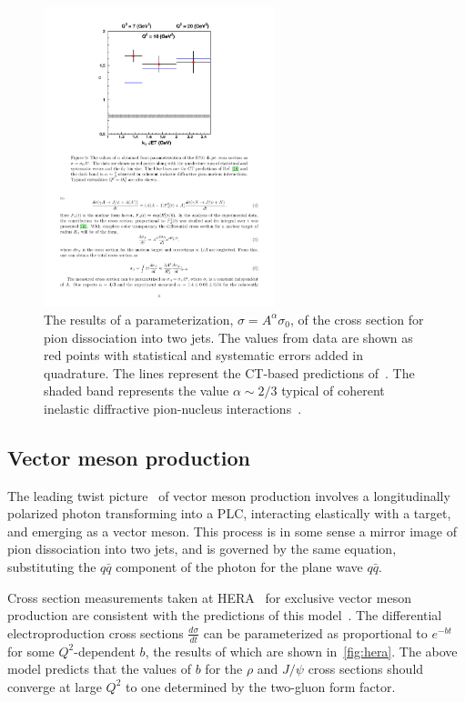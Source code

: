 \begin{figure}[!h]
    \centering
    \includegraphics[width=0.6\textwidth]{chap2/pion_dijet_alpha.pdf}
    \caption{The results of a parameterization, $\sigma=A^\alpha\sigma_0$, of
             the cross section for pion dissociation into two jets.
             The values from data are shown as red points with statistical and
             systematic errors added in quadrature.
             The lines represent the CT-based predictions
             of~\cite{Frankfurt_1993}.
             The shaded band represents the value $\alpha\sim2/3$ typical of
             coherent inelastic diffractive pion-nucleus
             interactions~\cite{Zielinsk_1983}.
            }
    \label{fig:pion_dijet_alpha}
\end{figure}



\subsection{Vector meson production}
The leading twist picture~\cite{Brodsky_1994} of vector meson production
involves a longitudinally polarized photon transforming into a PLC, interacting
elastically with a target, and emerging as a vector meson.
This process is in some sense a mirror image of pion dissociation into two jets,
and is governed by the same equation, substituting the $q\bar{q}$ component of
the photon for the plane wave $q\bar{q}$.


Cross section measurements taken at HERA~\cite{Chekanov_2004, Chekanov_2007}
for exclusive vector meson production are consistent with the predictions of
this model~\cite{Frankfurt_2005}.
The differential electroproduction cross sections $\frac{d\sigma}{dt}$ can be
parameterized as proportional to $e^{-bt}$ for some $Q^2$-dependent $b$, the
results of which are shown in~\ref{fig:hera}.
The above model predicts that the values of $b$ for the $\rho$ and $J/\psi$
cross sections should converge at large $Q^2$ to one determined by the
two-gluon form factor.

